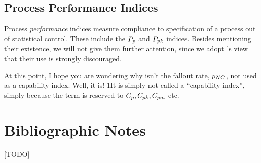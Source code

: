 \subsection{Process Performance Indices}
Process \emph{performance} indices measure compliance to specification of a process out of statistical control. 
These include the $P_{p}$ and $P_{pk}$ indices. 
Besides mentioning their existence, we will not give them further attention, since we adopt \cite{montgomery_introduction_2007}'s view that their use is strongly discouraged. 


\begin{remark}
At this point, I hope you are wondering why isn't the fallout rate, $p_{NC}$, not used as a capability index. 
Well, it is! 
1It is simply not called a ``capability index'', simply because the term is reserved to $C_p, C_{pk}, C_{pm}$ etc.
\end{remark}



\section{Bibliographic Notes}
[TODO]